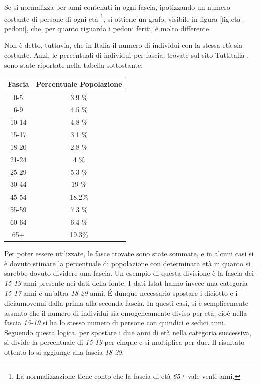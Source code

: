 \documentclass[a4paper]{report}
\begin{document}
Se si normalizza per anni contenuti in ogni fascia, ipotizzando un numero
costante di persone di ogni età
\footnote{La normalizzazione tiene conto che la fascia di età \textit{65+} vale 
venti anni.}, 
si ottiene un grafo, visibile in figura \ref{fig:eta-pedoni}, che, per quanto riguarda 
i pedoni feriti, è molto differente.

Non è detto, tuttavia, che in Italia il numero di individui con la stessa età sia costante.
Anzi, le percentuali di individui per fascia, trovate sul sito Tuttitalia \cite{TUTTITALIA:1}, 
sono state riportate nella tabella sottostante: 

\begin{center}
    \def\arraystretch{1.5}%
    \begin{tabular}{ |c|c| } 
    \hline
    Fascia & Percentuale Popolazione \\ 
    \hline
    \rowcolor{TableGray}
    0-5     & 3.9 \% \\ 
    6-9     & 4.5 \% \\
    \rowcolor{TableGray}
    10-14   & 4.8 \% \\
    15-17   & 3.1 \% \\
    \rowcolor{TableGray}
    18-20   & 2.8 \% \\ 
    21-24   & 4   \% \\
    \rowcolor{TableGray}
    25-29   & 5.3 \% \\
    30-44   & 19  \% \\
    \rowcolor{TableGray}
    45-54   & 18.2\% \\ 
    55-59   & 7.3 \% \\
    \rowcolor{TableGray}
    60-64   & 6.4 \% \\
    65$+$   & 19.3\% \\
    \hline
    \end{tabular}
\end{center}

Per poter essere utilizzate, le fasce trovate sono state sommate, e in alcuni casi si è dovuto 
stimare la percentuale di popolazione con determinata età in quanto si sarebbe dovuto dividere 
una fascia.
Un esempio di questa divisione è la fascia dei \textit{15-19} anni presente nei dati della fonte. 
I dati Istat hanno invece una categoria \textit{15-17} anni e un'altra \textit{18-29} anni. 
\'E dunque necessario spostare i diciotto e i diciannovenni dalla prima alla seconda fascia. 
In questi casi, si è semplicemente assunto che il numero di individui sia omogeneamente 
diviso per età, cioè nella fascia \textit{15-19} si ha lo stesso numero di persone con 
quindici e sedici anni.
Seguendo questa logica, per spostare i due anni di età nella categoria successiva, si divide 
la percentuale di \textit{15-19} per cinque e si moltiplica per due. Il risultato ottento 
lo si aggiunge alla fascia \textit{18-29}.
\end{document}
